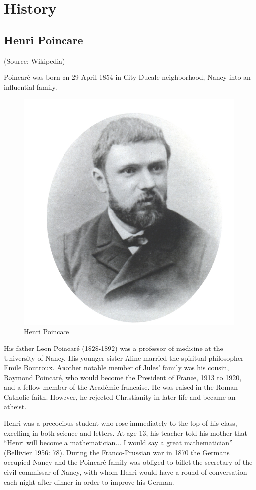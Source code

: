 \chapter{History}


\section{Henri Poincare}
(Source: Wikipedia)

Poincar\'{e} was born on 29 April 1854 in City Ducale neighborhood, Nancy into an influential family.
\begin{figure}[hbt!]
\centering
\includegraphics[width=.5\textwidth]{./images/poincare1.jpg}
\caption{Henri Poincare}\label{fig1}
\end{figure}


His father Leon Poincar\'{e} (1828-1892) was a professor of medicine at the University of Nancy. His younger sister Aline married the spiritual philosopher Emile Boutroux. Another notable member of Jules' family was his cousin, Raymond Poincar\'{e}, who would become the President of France, 1913 to 1920, and a fellow member of the Acad\'{e}mie francaise. He was raised in the Roman Catholic faith. However, he rejected Christianity in later life and became an atheist.

Henri was a precocious student who rose immediately to the top of his class, excelling in both science and letters. At age 13, his teacher told his mother that “Henri will become a mathematician... I would say a great mathematician” (Bellivier 1956: 78). During the Franco-Prussian war in 1870 the Germans occupied Nancy and the Poincar\'{e} family was obliged to billet the secretary of the civil commissar of Nancy, with whom Henri would have a round of conversation each night after dinner in order to improve his German.

